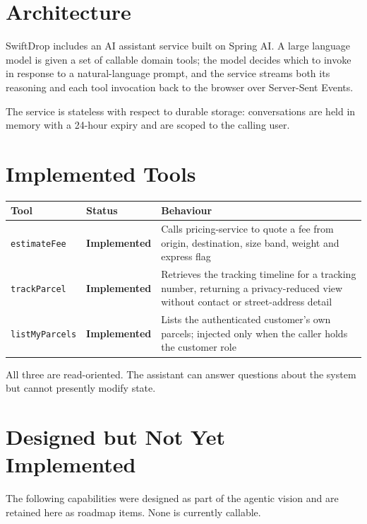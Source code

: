 \documentclass[11pt,a4paper,oneside,openany]{report}
\newcommand{\Impl}{\textbf{Implemented}}
\newcommand{\code}[1]{\texttt{\small #1}}
\begin{document}
\section{Architecture}
SwiftDrop includes an AI assistant service built on Spring AI. A large language model is given a
set of callable domain tools; the model decides which to invoke in response to a natural-language
prompt, and the service streams both its reasoning and each tool invocation back to the browser
over Server-Sent Events.

The service is stateless with respect to durable storage: conversations are held in memory with a
24-hour expiry and are scoped to the calling user.

\section{Implemented Tools}
\begin{center}
\small
\begin{tabular}{@{}p{3.1cm}p{2.3cm}p{8.4cm}@{}}
\toprule
\textbf{Tool} & \textbf{Status} & \textbf{Behaviour} \\
\midrule
\code{estimateFee}   & \Impl & Calls pricing-service to quote a fee from origin, destination, size
band, weight and express flag \\
\addlinespace
\code{trackParcel}   & \Impl & Retrieves the tracking timeline for a tracking number, returning a
privacy-reduced view without contact or street-address detail \\
\addlinespace
\code{listMyParcels} & \Impl & Lists the authenticated customer's own parcels; injected only when
the caller holds the customer role \\
\bottomrule
\end{tabular}
\label{tab:aitools}
\end{center}

All three are read-oriented. The assistant can answer questions about the system but cannot
presently modify state.

\section{Designed but Not Yet Implemented}
The following capabilities were designed as part of the agentic vision and are retained here as
roadmap items. None is currently callable.
\end{document}
